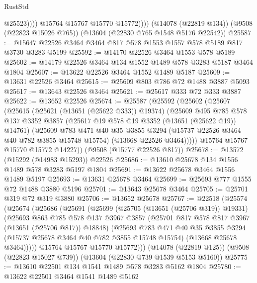 \begin{lexlean}{RustStd}
\begin{coremodule}
                    @25523))))
            @15764
            @15767
            @15770
            @15772))))
    (@14078 (@22819 @134))
    (@9508 (@22823 @15026 @765))
    (@13604 (@22830 @765 @1548 @5176 @22542))
@25587 := @15647 @22526 @3464 @3464 @817 @578 @1553 @1557 @578 @5189 @817 @3730 @3283 @5199
@25592 := @14170 @22526 @3464 @1553 @578 @5189
@25602 := @14179 @22526 @3464 @134 @1552 @1489 @578 @3283 @5187 @3464 @1804
@25607 := @13622 @22526 @3464 @1552 @1489 @5187
@25609 := @13631 @22526 @3464
@25615 := @25609 @803 @786 @72 @1488 @3887 @5093
@25617 := @13643 @22526 @3464
@25621 := @25617 @333 @72 @333 @3887
@25622 := @13652 @22526
@25674 := @25587
    (@25592
      (@25602
        (@25607
          (@25615
            (@25621 (@13651 (@25622 @333)) @19374)
            (@25609
              @495
              @785
              @578
              @137
              @3352
              @3857
              (@25617 @19 @578 @19 @3352 (@13651 (@25622 @19)) @14761)
              (@25609
                @783
                @471
                @40
                @35
                @3855
                @3294
                (@15737 @22526 @3464 @40 @782 @3855 @15748 @15754)
                (@13668 @22526 @3464)))))
        @15764
        @15767
        @15770
        @15772
        @14227))
    (@9508 (@15777 @22526 @817))
@25678 := @13572 (@15292 (@14983 @15293)) @22526
@25686 := @13610 @25678 @134 @1556 @1489 @578 @3283 @5197 @1804
@25691 := @13622 @25678 @3464 @1556 @1489 @5197
@25693 := @13631 @25678 @3464
@25699 := @25693 @777 @1555 @72 @1488 @3880 @5196
@25701 := @13643 @25678 @3464
@25705 := @25701 @319 @72 @319 @3880
@25706 := @13652 @25678
@25767 := @22518
    (@25574
      (@25674
        (@25686
          (@25691
            (@25699
              (@25705 (@13651 (@25706 @319)) @19331)
              (@25693
                @863
                @785
                @578
                @137
                @3967
                @3857
                (@25701 @817 @578 @817 @3967 (@13651 (@25706 @817)) @18848)
                (@25693
                  @783
                  @471
                  @40
                  @35
                  @3855
                  @3294
                  (@15737 @25678 @3464 @40 @782 @3855 @15748 @15754)
                  (@13668 @25678 @3464)))))
          @15764
          @15767
          @15770
          @15772)))
    (@14078 (@22819 @125))
    (@9508 (@22823 @15027 @739))
    (@13604 (@22830 @739 @1539 @5153 @5160))
@25775 := @13610 @22501 @134 @1541 @1489 @578 @3283 @5162 @1804
@25780 := @13622 @22501 @3464 @1541 @1489 @5162

\end{coremodule}
\end{lexlean}

